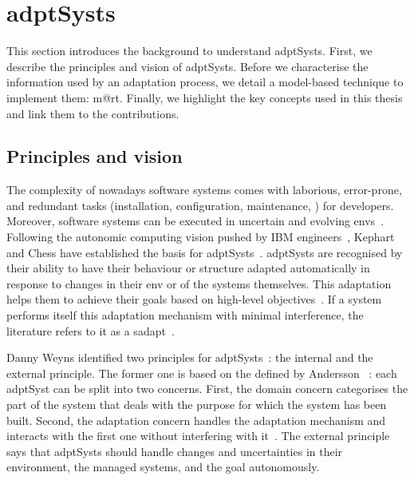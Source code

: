 \section[Adaptive systems]{\Glspl{adptSyst}}
\label{sec:back:adapt-syst}

This section introduces the background to understand \glspl{adptSyst}.
First, we describe the principles and vision of \glspl{adptSyst}.
Before we characterise the information used by an adaptation process, we detail a model-based technique to implement them: \gls{m@rt}.
Finally, we highlight the key concepts used in this thesis and link them to the contributions.

\subsection{Principles and vision}
The complexity of nowadays software systems comes with laborious, error-prone, and redundant tasks (installation, configuration, maintenance, \etc) for developers.
Moreover, software systems can be executed in uncertain and evolving \glspl{env}~\cite{DBLP:conf/dagstuhl/EsfahaniM10}.
Following the autonomic computing vision pushed by IBM engineers~\cite{computing2006architectural}, Kephart and Chess have established the basis for \glspl{adptSyst}~\cite{DBLP:journals/computer/KephartC03}.
\Glspl{adptSyst} are recognised by their ability to have their behaviour or structure adapted automatically in response to changes in their \gls{env} or of the systems themselves.
This adaptation helps them to achieve their goals based on high-level objectives~\cite{DBLP:conf/dagstuhl/ChengLGIMABBBCSDFGGGKKKLMMMPSTTWW09}.
If a system performs itself this adaptation mechanism with minimal interference, the literature refers to it as a \gls{sadapt}~\cite{DBLP:conf/dagstuhl/BrunSGGKLMPS09}.

Danny Weyns	identified two principles for \glspl{adptSyst}~\cite{DBLP:books/sp/19/Weyns19}: the internal and the external principle.
The former one is based on the  defined by Andersson \etal ~\cite{DBLP:conf/icse/AnderssonLMW09}: each \gls{adptSyst} can be split into two concerns.
First, the domain concern categorises the part of the system that deals with the purpose for which the system has been built.
Second, the adaptation concern handles the adaptation mechanism and interacts with the first one without interfering with it~\cite{DBLP:journals/tse/KramerM90}.
The external principle says that \glspl{adptSyst} should handle changes and uncertainties in their environment, the managed systems, and the goal autonomously.

